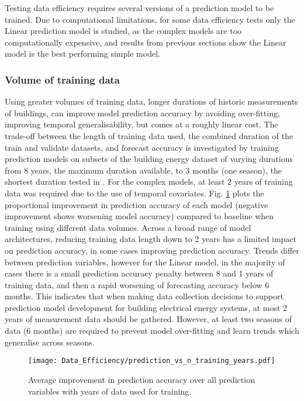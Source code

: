 Testing data efficiency requires several versions of a prediction model to be trained. Due to computational limitations, for some data efficiency tests only the Linear prediction model is studied, as the complex models are too computationally expensive, and results from previous sections show the Linear model is the best performing simple model.

\subsubsection{Volume of training data} \label{sec:forecasting-data-efficiency-training-data}


Using greater volumes of training data, longer durations of historic measurements of buildings, can improve model prediction accuracy by avoiding over-fitting, improving temporal generalisability, but comes at a roughly linear cost. The trade-off between the length of training data used, the combined duration of the train and validate datasets, and forecast accuracy is investigated by training prediction models on subsets of the building energy dataset of varying durations from 8 years, the maximum duration available, to 3 months (one season), the shortest duration tested in \citep{choi2023PerformanceEvaluationDeep}. For the complex models, at least 2 years of training data was required due to the use of temporal covariates. Fig. \ref{fig:forecasting-data-eff-n-training-years} plots the proportional improvement in prediction accuracy of each model (negative improvement shows worsening model accuracy) compared to baseline when training using different data volumes. Across a broad range of model architectures, reducing training data length down to 2 years has a limited impact on prediction accuracy, in some cases improving prediction accuracy. Trends differ between prediction variables, however for the Linear model, in the majority of cases there is a small prediction accuracy penalty between 8 and 1 years of training data, and then a rapid worsening of forecasting accuracy below 6 months.
This indicates that when making data collection decisions to support prediction model development for building electrical energy systems, at most 2 years of measurement data should be gathered. However, at least two seasons of data (6 months) are required to prevent model over-fitting and learn trends which generalise across seasons.

\begin{figure}
    \centering
    \texttt{[image: Data\_Efficiency/prediction\_vs\_n\_training\_years.pdf]}
    \caption{Average improvement in prediction accuracy over all prediction variables with years of data used for training.}
    \label{fig:forecasting-data-eff-n-training-years}
\end{figure}


